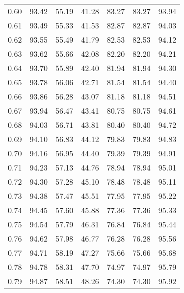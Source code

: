 \begin{tabular}{|c|c|c|c|c|c|c|}
      0.60 &     93.42 &     55.19 &      41.28 &   83.27 &      83.27 &         93.94 \\
      0.61 &     93.49 &     55.33 &      41.53 &   82.87 &      82.87 &         94.03 \\
      0.62 &     93.55 &     55.49 &      41.79 &   82.53 &      82.53 &         94.12 \\
      0.63 &     93.62 &     55.66 &      42.08 &   82.20 &      82.20 &         94.21 \\
      0.64 &     93.70 &     55.89 &      42.40 &   81.94 &      81.94 &         94.30 \\
      0.65 &     93.78 &     56.06 &      42.71 &   81.54 &      81.54 &         94.40 \\
      0.66 &     93.86 &     56.28 &      43.07 &   81.18 &      81.18 &         94.51 \\
      0.67 &     93.94 &     56.47 &      43.41 &   80.75 &      80.75 &         94.61 \\
      0.68 &     94.03 &     56.71 &      43.81 &   80.40 &      80.40 &         94.72 \\
      0.69 &     94.10 &     56.83 &      44.12 &   79.83 &      79.83 &         94.83 \\
      0.70 &     94.16 &     56.95 &      44.40 &   79.39 &      79.39 &         94.91 \\
      0.71 &     94.23 &     57.13 &      44.76 &   78.94 &      78.94 &         95.01 \\
      0.72 &     94.30 &     57.28 &      45.10 &   78.48 &      78.48 &         95.11 \\
      0.73 &     94.38 &     57.47 &      45.51 &   77.95 &      77.95 &         95.22 \\
      0.74 &     94.45 &     57.60 &      45.88 &   77.36 &      77.36 &         95.33 \\
      0.75 &     94.54 &     57.79 &      46.31 &   76.84 &      76.84 &         95.44 \\
      0.76 &     94.62 &     57.98 &      46.77 &   76.28 &      76.28 &         95.56 \\
      0.77 &     94.71 &     58.19 &      47.27 &   75.66 &      75.66 &         95.68 \\
      0.78 &     94.78 &     58.31 &      47.70 &   74.97 &      74.97 &         95.79 \\
      0.79 &     94.87 &     58.51 &      48.26 &   74.30 &      74.30 &         95.92 \\

\end{tabular}
